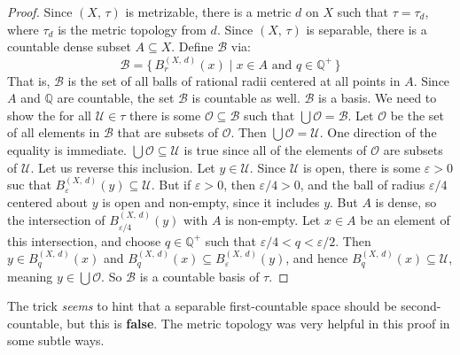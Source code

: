 \documentclass{article}
\theoremstyle{plain}
\theoremstyle{normal}
\begin{document}
        \begin{proof}
            Since $(X,\,\tau)$ is metrizable, there is a metric $d$ on $X$
            such that $\tau=\tau_{d}$, where $\tau_{d}$ is the metric topology
            from $d$. Since $(X,\,\tau)$ is separable, there is a countable
            dense subset $A\subseteq{X}$. Define $\mathcal{B}$ via:
            \begin{equation}
                \mathcal{B}=
                \{\,B_{r}^{(X,\,d)}(x)\;|\;
                    x\in{A}\textrm{ and }q\in\mathbb{Q}^{+}\,\}
            \end{equation}
            That is, $\mathcal{B}$ is the set of all balls of rational radii
            centered at all points in $A$. Since $A$ and $\mathbb{Q}$ are
            countable, the set $\mathcal{B}$ is countable as well.
            $\mathcal{B}$ is a basis. We need to show the for all
            $\mathcal{U}\in\tau$ there is some $\mathcal{O}\subseteq\mathcal{B}$
            such that $\bigcup\mathcal{O}=\mathcal{B}$. Let
            $\mathcal{O}$ be the set of all elements in $\mathcal{B}$ that are
            subsets of $\mathcal{O}$. Then $\bigcup\mathcal{O}=\mathcal{U}$.
            One direction of the equality is immediate.
            $\bigcup\mathcal{O}\subseteq\mathcal{U}$ is true since all of the
            elements of $\mathcal{O}$ are subsets of $\mathcal{U}$. Let us
            reverse this inclusion. Let $y\in\mathcal{U}$. Since
            $\mathcal{U}$ is open, there is some $\varepsilon>0$ suc that
            $B_{\varepsilon}^{(X,\,d)}(y)\subseteq\mathcal{U}$. But if
            $\varepsilon>0$, then $\varepsilon/4>0$, and the ball of radius
            $\varepsilon/4$ centered about $y$ is open and non-empty, since it
            includes $y$. But $A$ is dense, so the intersection of
            $B_{\varepsilon/4}^{(X,\,d)}(y)$ with $A$ is non-empty. Let
            $x\in{A}$ be an element of this intersection, and choose
            $q\in\mathbb{Q}^{+}$ such that $\varepsilon/4<q<\varepsilon/2$.
            Then $y\in{B}_{q}^{(X,\,d)}(x)$ and
            $B_{q}^{(X,\,d)}(x)\subseteq{B}_{\varepsilon}^{(X,\,d)}(y)$, and
            hence $B_{q}^{(X,\,d)}(x)\subseteq\mathcal{U}$, meaning
            $y\in\bigcup\mathcal{O}$. So $\mathcal{B}$ is a countable basis of
            $\tau$.
        \end{proof}
        The trick \textit{seems} to hint that a separable first-countable space
        should be second-countable, but this is \textbf{false}. The metric
        topology was very helpful in this proof in some subtle ways.
\end{document}
